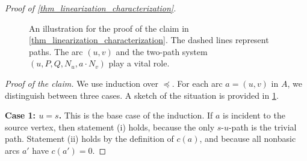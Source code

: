 \begin{proof}[Proof of \cref{thm_linearization_characterization}]
\begin{figure}[bth]
\centering
{}
\caption{
An illustration for the proof of the claim
in \cref{thm_linearization_characterization}. The dashed lines represent paths. The arc $(u,v)$ and the two-path system $(u,P,Q,N_u, a\cdot N_v)$ play a vital role.}
 \label{fig:specific-system}
\end{figure}
    \textit{Proof of the claim.} We use induction over $\preceq$. For each arc $a = (u, v)$ in $A$, we distinguish between three cases. A sketch of the situation is provided in \cref{fig:specific-system}.

    
    \textbf{Case 1: $u = s$.} This is the base case of the induction. If $a$ is incident to the source vertex, then statement (i) holds, because the only $s$-$u$-path is the trivial path. Statement (ii) holds by the definition of $c(a)$, and because all nonbasic arcs $a'$ have $c(a') = 0$.
    

\end{proof}
